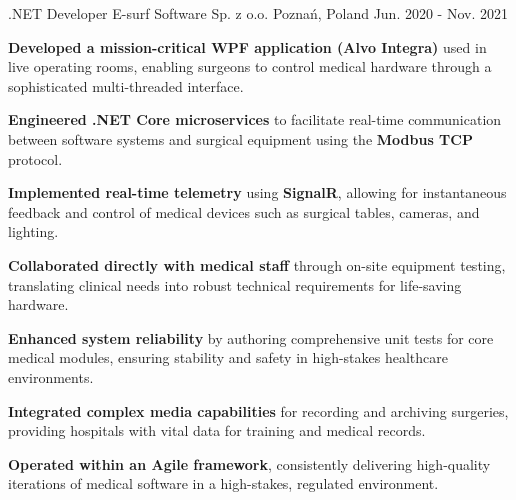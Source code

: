 \begin{cventries}
  \cventry
    {.NET Developer} %
    {E-surf Software Sp. z o.o.} %
    {Poznań, Poland} %
    {Jun. 2020 - Nov. 2021} %
    {
      \begin{cvitems} %
        \item {\textbf{Developed a mission-critical WPF application (Alvo Integra)} used in live operating rooms, enabling surgeons to control medical hardware through a sophisticated multi-threaded interface.}
        \item {\textbf{Engineered .NET Core microservices} to facilitate real-time communication between software systems and surgical equipment using the \textbf{Modbus TCP} protocol.}
        \item {\textbf{Implemented real-time telemetry} using \textbf{SignalR}, allowing for instantaneous feedback and control of medical devices such as surgical tables, cameras, and lighting.}
        \item {\textbf{Collaborated directly with medical staff} through on-site equipment testing, translating clinical needs into robust technical requirements for life-saving hardware.}
        \item {\textbf{Enhanced system reliability} by authoring comprehensive unit tests for core medical modules, ensuring stability and safety in high-stakes healthcare environments.}
        \item {\textbf{Integrated complex media capabilities} for recording and archiving surgeries, providing hospitals with vital data for training and medical records.}
        \item {\textbf{Operated within an Agile framework}, consistently delivering high-quality iterations of medical software in a high-stakes, regulated environment.}
      \end{cvitems}
    }


\end{cventries}
